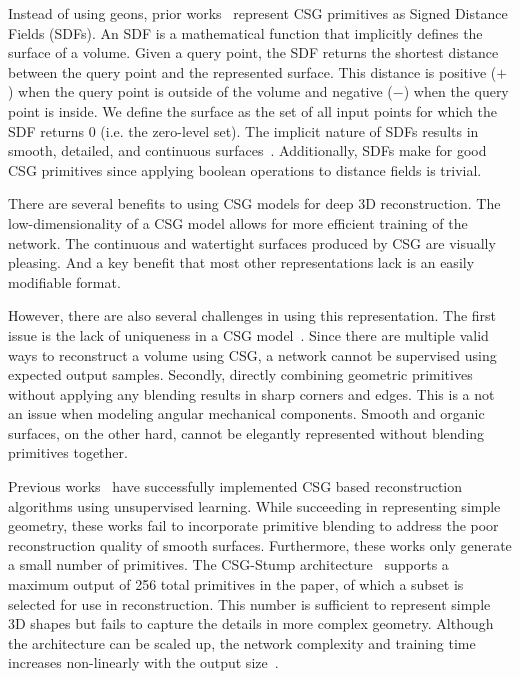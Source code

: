 Instead of using geons, prior works~\cite{Sharma2018, Kania2020, Ren2021} represent CSG primitives as Signed Distance Fields (SDFs). An SDF is a mathematical function that implicitly defines the surface of a volume. Given a query point, the SDF returns the shortest distance between the query point and the represented surface. This distance is positive ($+$) when the query point is outside of the volume and negative ($-$) when the query point is inside. We define the surface as the set of all input points for which the SDF returns 0 (i.e. the zero-level set). The implicit nature of SDFs results in smooth, detailed, and continuous surfaces~\cite{Park2019}. Additionally, SDFs make for good CSG primitives since applying boolean operations to distance fields is trivial.

There are several benefits to using CSG models for deep 3D reconstruction. The low-dimensionality of a CSG model allows for more efficient training of the network. The continuous and watertight surfaces produced by CSG are visually pleasing. And a key benefit that most other representations lack is an easily modifiable format.

However, there are also several challenges in using this representation. The first issue is the lack of uniqueness in a CSG model~\cite{Hughes2013}. Since there are multiple valid ways to reconstruct a volume using CSG, a network cannot be supervised using expected output samples. Secondly, directly combining geometric primitives without applying any blending results in sharp corners and edges. This is a not an issue when modeling angular mechanical components. Smooth and organic surfaces, on the other hard, cannot be elegantly represented without blending primitives together.

Previous works~\cite{Sharma2018, Kania2020, Ren2021} have successfully implemented CSG based reconstruction algorithms using unsupervised learning. While succeeding in representing simple geometry, these works fail to incorporate primitive blending to address the poor reconstruction quality of smooth surfaces. Furthermore, these works only generate a small number of primitives. The CSG-Stump architecture~\cite{Ren2021} supports a maximum output of 256 total primitives in the paper, of which a subset is selected for use in reconstruction. This number is sufficient to represent simple 3D shapes but fails to capture the details in more complex geometry. Although the architecture can be scaled up, the network complexity and training time increases non-linearly with the output size~\cite{Ren2021}.

